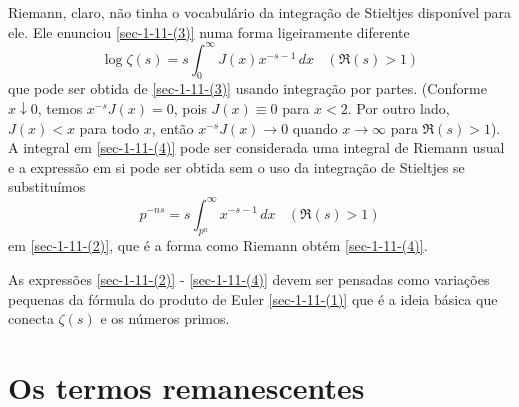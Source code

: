     Riemann, claro, não tinha o vocabulário da integração de Stieltjes disponível para ele. Ele enunciou \eqref{sec-1-11-(3)} numa forma ligeiramente diferente
    \begin{equation}
        \label{sec-1-11-(4)}
        \log \zeta(s) = s\int_{0}^{\infty} J(x)x^{-s-1} \, dx \ \ \ \ (\Re(s)>1)
    \end{equation}
    que pode ser obtida de \eqref{sec-1-11-(3)} usando integração por partes. (Conforme $x \downarrow 0$, temos $x^{-s}J(x) = 0$, pois $J(x) \equiv 0$ para $x<2$. Por outro lado, $J(x) < x$ para todo $x$, então $x^{-s}J(x) \to 0$ quando $x \to \infty$ para $\Re(s) > 1$). A integral em \eqref{sec-1-11-(4)} pode ser considerada uma integral de Riemann usual e a expressão em si pode ser obtida sem o uso da integração de Stieltjes se substituímos
    \begin{equation*}
        \label{sec-1-11-(4)}
        p^{-ns} = s\int_{p^n}^{\infty} x^{-s-1} \, dx \ \ \ \ (\Re(s)>1)
    \end{equation*}
    em \eqref{sec-1-11-(2)}, que é a forma como Riemann obtém \eqref{sec-1-11-(4)}.
    
    As expressões \eqref{sec-1-11-(2)} - \eqref{sec-1-11-(4)} devem ser pensadas como variações pequenas da fórmula do produto de Euler \eqref{sec-1-11-(1)} que é a ideia básica que conecta $\zeta(s)$ e os números primos.
    
    
    \section{Os termos remanescentes} \label{sec-0.16}
    
    
    
    
    
    
    
    
    
    
    
    
    
    
    
    













